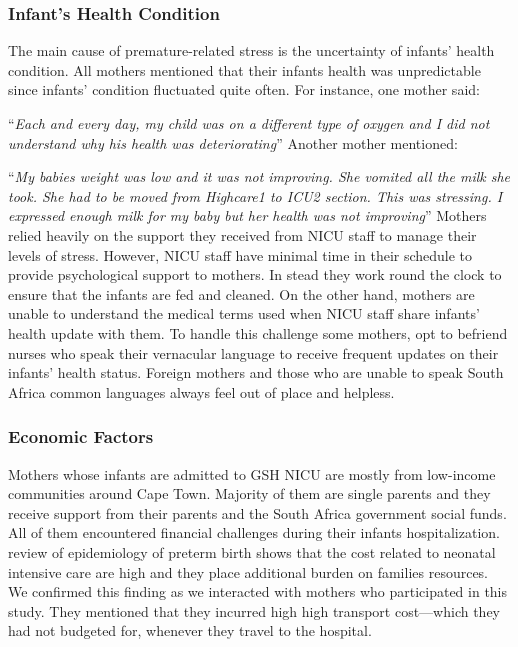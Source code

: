 \subsubsection{Infant’s Health Condition}
The main cause of premature-related stress is the uncertainty of infants' health condition. All mothers mentioned that their infants health was unpredictable since infants' condition fluctuated quite often. For instance, one mother said:

\enquote{\itshape Each and every day, my child was on a different type of oxygen and I did not understand why his health was deteriorating} \bigbreak
Another mother mentioned:

\enquote{\itshape My babies weight was low and it was not improving. She vomited all the milk she took. She had to be moved from Highcare1 to ICU2 section. This was stressing. I expressed enough milk for my baby but her health was not improving} \bigbreak
Mothers relied heavily on the support they received from NICU staff to manage their levels of stress. However, NICU staff have minimal time  in their schedule to provide psychological support to mothers. In stead they work round the clock to ensure that the infants are fed and cleaned. On the other hand, mothers are unable to understand the medical terms used when NICU staff share infants' health update with them. To handle this challenge some mothers, opt to befriend nurses who speak their vernacular language to receive frequent updates on their infants' health status. Foreign mothers and those who are unable to speak South Africa common languages always feel out of place and helpless.
 
\subsubsection{Economic Factors}
Mothers whose infants are admitted to GSH NICU are mostly from low-income communities around Cape Town. Majority of them are single parents and they receive support from their parents and the South Africa government social funds. All of them encountered financial challenges during their infants hospitalization. \textcite{Blencowe2013} review of epidemiology of preterm birth shows that the cost related to neonatal intensive care are high and they place additional burden on families resources. We confirmed this finding as we interacted with mothers who participated in this study. They mentioned that they incurred high high transport cost---which they had not budgeted for, whenever they travel to the hospital.

